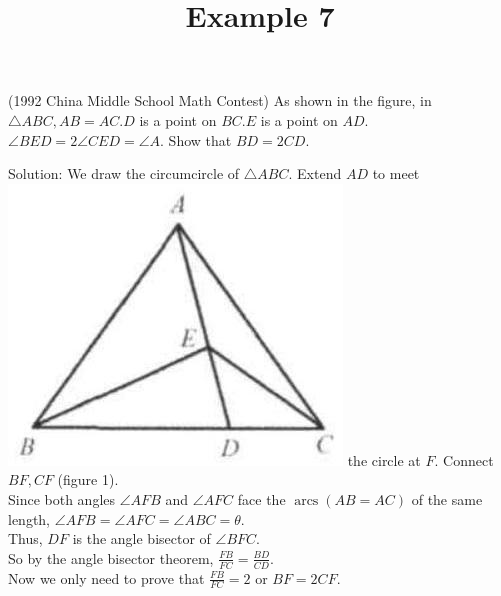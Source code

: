 \documentclass{article}
\title{Example 7}
\date{}
\begin{document}
\maketitle

(1992 China Middle School Math Contest) As shown in the figure, in \(\triangle A B C, A B=A C . D\) is a point on \(B C . E\) is a point on \(A D\). \(\angle B E D=2 \angle C E D=\angle A\). Show that \(B D=2 C D\).

Solution:
We draw the circumcircle of \(\triangle A B C\). Extend \(A D\) to meet\\
\includegraphics[width=\textwidth]{images/202(2).jpg} the circle at \(F\). Connect \(B F, C F\) (figure 1).\\
Since both angles \(\angle A F B\) and \(\angle A F C\) face the \(\operatorname{arcs}(A B=A C)\) of the same length, \(\angle A F B=\angle A F C=\angle A B C=\theta\).\\
Thus, \(D F\) is the angle bisector of \(\angle B F C\).\\
So by the angle bisector theorem, \(\frac{F B}{F C}=\frac{B D}{C D}\).\\
Now we only need to prove that \(\frac{F B}{F C}=2\) or \(B F=2 C F\).\\
\centering
\end{document}
